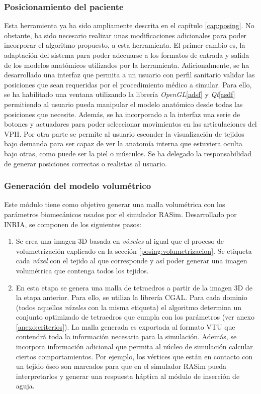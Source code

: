 \subsubsection{ Posicionamiento del paciente}
Esta herramienta ya ha sido ampliamente descrita en el capítulo \ref{cap:posing}. 
No obstante, ha sido necesario realizar unas modificaciones adicionales para poder incorporar el algoritmo propuesto, a esta herramienta. El primer cambio es, la adaptación del sistema para poder adecuarse a los formatos de entrada y salida de los modelos anatómicos utilizados por la herramienta. Adicionalmente, se ha desarrollado una interfaz que permita a un usuario con perfil sanitario validar las posiciones que sean requeridas por el procedimiento médico a simular. Para ello, se ha habilitado una ventana utilizando la librería \emph{OpenGL}\ref{adsf} y \emph{Qt}\ref{asdf} permitiendo al usuario pueda manipular el modelo anatómico desde todas las posiciones que necesite. Además, se ha incorporado a la interfaz una serie de botones y actuadores para poder seleccionar movimientos en las articulaciones del \ac{VPH}. Por otra parte se permite al usuario esconder la visualización de tejidos bajo demanda para ser capaz de ver la anatomía interna que estuviera oculta bajo otras, como puede ser la piel o músculos. Se ha delegado la responsabilidad de generar posiciones correctas o realistas al usuario.

\subsubsection{Generación del modelo volumétrico}

Este módulo tiene como objetivo generar una malla volumétrica con los parámetros biomecánicos usados por el simulador \ac{RASim}. Desarrollado por \ac{INRIA}, se componen de los siguientes pasos:
\begin{enumerate}
    \item Se crea una imagen 3D basada en \emph{vóxeles} al igual que el proceso de volumetrización explicado en la sección \ref{posing:volumetrizacion}. Se etiqueta cada \emph{vóxel} con el tejido al que corresponde y así poder generar una imagen volumétrica que contenga todos los tejidos.
\item En esta etapa se genera una malla de tetraedros a partir de la imagen 3D de la etapa anterior. Para ello, se utiliza la librería \ac{CGAL}.
Para cada dominio (todos aquellos \emph{vóxeles} con la misma etiqueta) el algoritmo determina un conjunto optimizado de tetraedros que cumpla con los parámetros (ver anexo \ref{anexo:criterios}).  
La malla generada es exportada al formato \ac{VTU} que contendrá toda la información necesaria para la simulación.
Además, se incorpora información adicional que permita al núcleo de simulación calcular ciertos comportamientos. Por ejemplo, los vértices que están en contacto con un tejido óseo son marcados para que en el simulador \ac{RASim} pueda interpretarlos y generar una respuesta háptica al módulo de inserción de aguja.

\end{enumerate}

